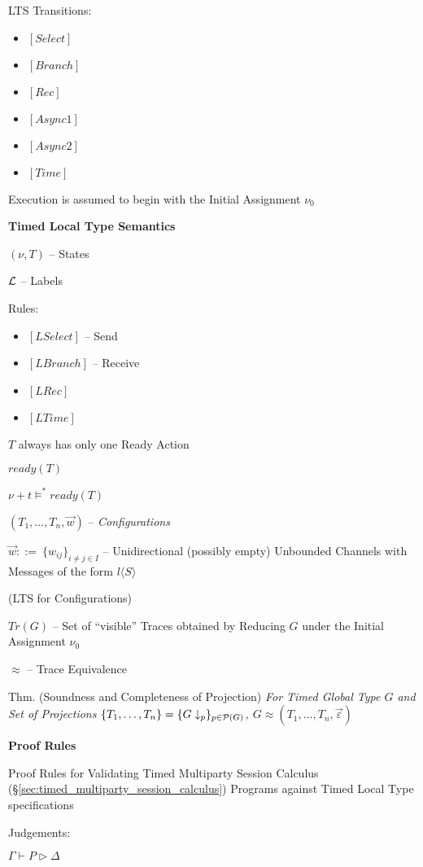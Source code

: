 LTS Transitions:
\begin{itemize}
  \item $[Select]$
  \item $[Branch]$
  \item $[Rec]$
  \item $[Async1]$
  \item $[Async2]$
  \item $[Time]$
\end{itemize}

Execution is assumed to begin with the Initial Assignment $\nu_0$


\textbf{Timed Local Type Semantics}

$(\nu, T)$ -- States

$\mathcal{L}$ -- Labels

Rules:
\begin{itemize}
  \item $[LSelect]$ -- Send
  \item $[LBranch]$ -- Receive
  \item $[LRec]$
  \item $[LTime]$
\end{itemize}

$T$ always has only one Ready Action

$ready(T)$

$\nu + t \vDash^* ready(T)$

$(T_1, \ldots, T_n, \vec{w})$ -- \emph{Configurations}

$\vec{w} ::=\ \{w_{ij}\}_{i \neq j \in I}$ -- Unidirectional (possibly
empty) Unbounded Channels with Messages of the form
$l\langle{S}\rangle$

(LTS for Configurations) %

$Tr(G)$ -- Set of ``visible'' Traces obtained by Reducing $G$ under
the Initial Assignment $\nu_0$

$\approx$ -- Trace Equivalence

Thm. (Soundness and Completeness of Projection) \emph{For Timed Global
  Type $G$ and Set of Projections $\{T_1,\ldots,T_n\} =
  \{G\downarrow_p\}_{p \in \mathcal{P}(G)}$, $G \approx
  (T_1,\ldots,T_n,\vec{\varepsilon})$}


\textbf{Proof Rules}

Proof Rules for Validating Timed Multiparty Session Calculus
(\S\ref{sec:timed_multiparty_session_calculus}) Programs
against Timed Local Type specifications

Judgements:

$\Gamma \vdash P \rhd \Delta$

